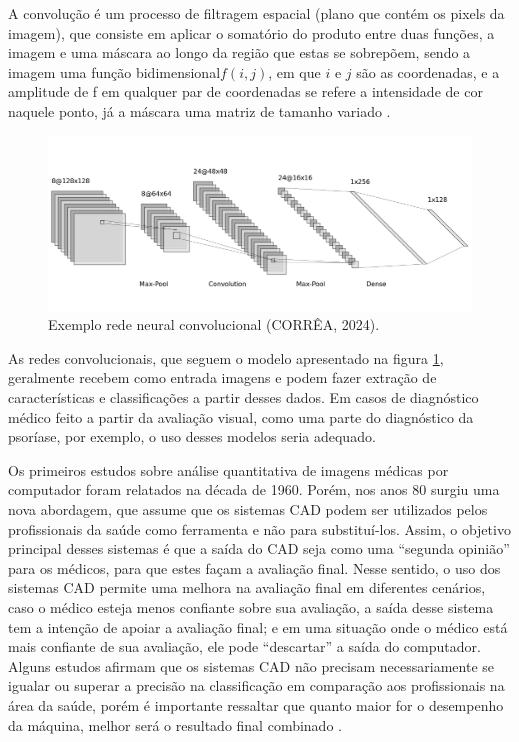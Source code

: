 A convolução é um processo de filtragem espacial (plano que contém os pixels da imagem), que consiste em aplicar o somatório do produto entre duas funções, a imagem e uma máscara ao longo da região que estas se sobrepõem, sendo a imagem uma função bidimensional\( f(i,j)\), em que \(i\) e \(j\) são as coordenadas, e a amplitude de f em qualquer par de coordenadas se refere a intensidade de cor naquele ponto, já a máscara uma matriz de tamanho variado \cite{gonzalez2008digital}. 

\begin{figure}[h]
    \centering
    \includegraphics[scale=0.4]{images/redeconv.png}
    \caption{Exemplo rede neural convolucional (CORRÊA, 2024).}
    \label{fig: cnn}
\end{figure}

As redes convolucionais, que seguem o modelo apresentado na figura \ref{fig: cnn}, geralmente recebem como entrada imagens e podem fazer extração de características e classificações a partir desses dados. Em casos de diagnóstico médico feito a partir da avaliação visual, como uma parte do diagnóstico da psoríase, por exemplo, o uso desses modelos seria adequado.

Os primeiros estudos sobre análise quantitativa de imagens médicas por computador foram relatados na década de 1960. Porém, nos anos 80 surgiu uma nova abordagem, que assume que os sistemas CAD podem ser utilizados pelos profissionais da saúde como ferramenta e não para substituí-los. Assim, o objetivo principal desses sistemas é que a saída do CAD seja como uma “segunda opinião” para os médicos, para que estes façam a avaliação final. Nesse sentido, o uso dos sistemas CAD permite uma melhora na avaliação final em diferentes cenários, caso o médico esteja menos confiante sobre sua avaliação, a saída desse sistema tem a intenção de apoiar a avaliação final; e em uma situação onde o médico está mais confiante de sua avaliação, ele pode “descartar” a saída do computador. Alguns estudos afirmam que os sistemas CAD não precisam necessariamente se igualar ou superar a precisão na classificação em comparação aos profissionais na área da saúde, porém é importante ressaltar que quanto maior for o desempenho da máquina, melhor será o resultado final combinado \cite{DOI2007198}.


